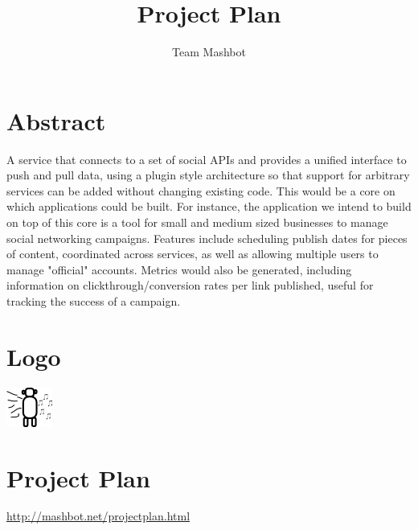 \documentclass{report}
\title{Project Plan}
\author{Team Mashbot}
\begin{document}
	\chapter{Abstract}
		A service that connects to a set of social APIs and provides a unified
		interface to push and pull data, using a plugin style architecture so
		that support for arbitrary services can be added without changing
		existing code.  This would be a core on which applications could be
		built.  For instance, the application we intend to build on top of
		this core is a tool for small and medium sized businesses to manage
		social networking campaigns. Features include scheduling publish dates
		for pieces of content, coordinated across services, as well as
		allowing multiple users to manage "official" accounts.  Metrics would
		also be generated, including information on clickthrough/conversion
		rates per link published, useful for tracking the success of a
		campaign.

	\chapter{Logo}
		\includegraphics{logo.png}	

	\chapter{Project Plan}
		\url{http://mashbot.net/projectplan.html}
\end{document}
